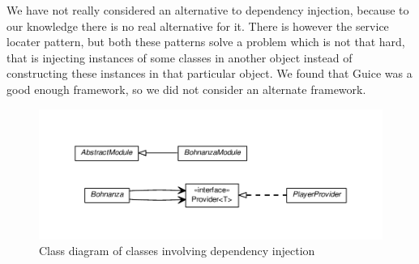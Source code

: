 We have not really considered an alternative to dependency injection, because to our knowledge there is no real alternative
for it. There is however the service locater pattern, but both these patterns solve a problem which
is not that hard, that is injecting instances of some classes in another object instead of
constructing these instances in that particular object. We found that Guice was a good enough
framework, so we did not consider an alternate framework.

\begin{figure}[h!]
    \includegraphics[width=\textwidth]{../umlgraph/ModuleGraph}
    \caption{Class diagram of classes involving dependency injection}
    \label{fig:design:di}
\end{figure}
